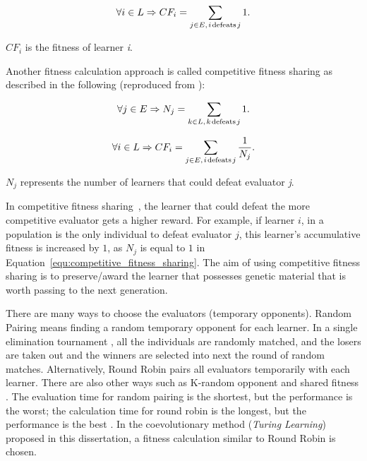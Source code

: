 \begin{equation}\label{equ:simple_fitness_calculation}
\forall i \in L \Rightarrow C{F_i} = \sum\limits_{j \in E,{\kern 1pt} i{\kern 1pt} \text{defeats} {\kern 1pt} j} 1.
\end{equation}

$C{F_i}$ is the fitness of learner \textit{i}. 

Another fitness calculation approach is called competitive fitness sharing \cite{Rosin_1997} as described in the following (reproduced from \cite{BiLi2009}):

\begin{equation}
\forall j \in E \Rightarrow {N_j} = \sum\limits_{k \in L,{\kern 1pt} k{\kern 1pt} \text{defeats} {\kern 1pt} j} 1.
\end{equation}

\begin{equation}\label{equ:competitive_fitness_sharing}
\forall i \in L \Rightarrow C{F_i} = \sum\limits_{j \in E,{\kern 1pt} i{\kern 1pt} \text{defeats} {\kern 1pt} j} {\frac{1}{{{N_j}}}}.
\end{equation}

${N_j}$ represents the number of learners that could defeat evaluator \textit{j}.  

In competitive fitness sharing~\cite{Rosin_1997}, the learner that could defeat the more competitive evaluator gets a higher reward. For example, if learner $i$, in a population is the only individual to defeat evaluator $j$, this learner's accumulative fitness is increased by $1$, as $N_j$ is equal to $1$ in Equation~\eqref{equ:competitive_fitness_sharing}. The aim of using competitive fitness sharing is to preserve/award the learner that possesses genetic material that is worth passing to the next generation. 

There are many ways to choose the evaluators (temporary opponents). Random Pairing \cite{Panait_2002} means finding a random temporary opponent for each learner. In a single elimination tournament \cite{Tan_2007}, all the individuals are randomly matched, and the losers are taken out and the winners are selected into next the round of random matches. Alternatively, Round Robin \cite{Panait_2002} pairs all evaluators temporarily with each learner. There are also other ways such as K-random opponent \cite{Tan_2007} and shared fitness \cite{Rosin_1997}. The evaluation time for random pairing is the shortest, but the performance is the worst; the calculation time for round robin is the longest, but the performance is the best \cite{BiLi2009}. In the coevolutionary method (\textit{Turing Learning}) proposed in this dissertation, a fitness calculation similar to Round Robin is chosen.

